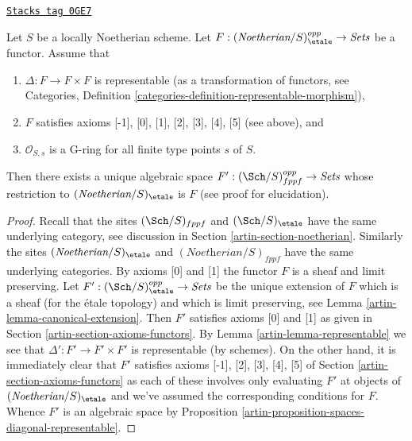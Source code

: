 \begin{proposition}
\label{artin-proposition-spaces-diagonal-representable-noetherian}
\href{https://stacks.math.columbia.edu/tag/0GE7}{\texttt{Stacks tag 0GE7}}

Let $S$ be a locally Noetherian scheme. Let
$F : (\textit{Noetherian}/S)_\etale^{opp} \to \textit{Sets}$
be a functor. Assume that
\begin{enumerate}
\item $\Delta : F \to F \times F$ is representable
(as a transformation of functors, see
Categories, Definition \ref{categories-definition-representable-morphism}),
\item $F$ satisfies axioms [-1], [0], [1], [2], [3], [4], [5]
(see above), and
\item $\mathcal{O}_{S, s}$ is a G-ring for all finite type points $s$ of $S$.
\end{enumerate}
Then there exists a unique algebraic space
$F' : (\Sch/S)_{fppf}^{opp} \to \textit{Sets}$
whose restriction to $(\textit{Noetherian}/S)_\etale$ is $F$
(see proof for elucidation).
\end{proposition}

\begin{proof}

Recall that the sites $(\Sch/S)_{fppf}$ and $(\Sch/S)_\etale$ have the same
underlying category, see discussion in Section \ref{artin-section-noetherian}.
Similarly the sites $(\textit{Noetherian}/S)_\etale$ and
$(\textit{Noetherian}/S)_{fppf}$ have the same underlying categories.
By axioms [0] and [1] the functor $F$ is a sheaf and
limit preserving.
Let $F' : (\Sch/S)_\etale^{opp} \to \textit{Sets}$
be the unique extension of $F$ which is a sheaf (for the \'etale topology)
and which is limit preserving, see
Lemma \ref{artin-lemma-canonical-extension}.
Then $F'$ satisfies axioms [0] and [1] as given in
Section \ref{artin-section-axioms-functors}.
By Lemma \ref{artin-lemma-representable} we see that
$\Delta' : F' \to F' \times F'$ is representable (by schemes).
On the other hand, it is immediately clear that
$F'$ satisfies axioms [-1], [2], [3], [4], [5] of
Section \ref{artin-section-axioms-functors}
as each of these involves only evaluating $F'$ at objects
of $(\textit{Noetherian}/S)_\etale$ and we've assumed the
corresponding conditions for $F$.
Whence $F'$ is an algebraic space by
Proposition \ref{artin-proposition-spaces-diagonal-representable}.
\end{proof}

